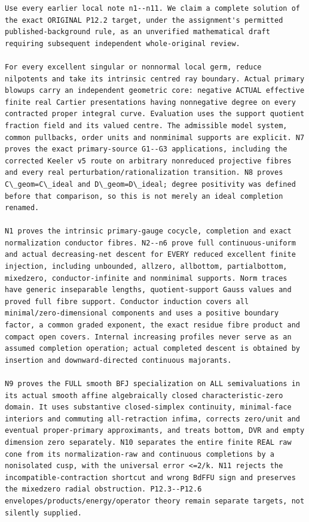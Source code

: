 \documentclass[11pt]{article}
\begin{document}
\begin{Verbatim}[breaklines,fontsize=\tiny]
Use every earlier local note n1--n11. We claim a complete solution of the exact ORIGINAL P12.2 target, under the assignment's permitted published-background rule, as an unverified mathematical draft requiring subsequent independent whole-original review.

For every excellent singular or nonnormal local germ, reduce nilpotents and take its intrinsic centred ray boundary. Actual primary blowups carry an independent geometric core: negative ACTUAL effective finite real Cartier presentations having nonnegative degree on every contracted proper integral curve. Evaluation uses the support quotient fraction field and its valued centre. The admissible model system, common pullbacks, order units and nonminimal supports are explicit. N7 proves the exact primary-source G1--G3 applications, including the corrected Keeler v5 route on arbitrary nonreduced projective fibres and every real perturbation/rationalization transition. N8 proves C\_geom=C\_ideal and D\_geom=D\_ideal; degree positivity was defined before that comparison, so this is not merely an ideal completion renamed.

N1 proves the intrinsic primary-gauge cocycle, completion and exact normalization conductor fibres. N2--n6 prove full continuous-uniform and actual decreasing-net descent for EVERY reduced excellent finite injection, including unbounded, allzero, allbottom, partialbottom, mixedzero, conductor-infinite and nonminimal supports. Norm traces have generic inseparable lengths, quotient-support Gauss values and proved full fibre support. Conductor induction covers all minimal/zero-dimensional components and uses a positive boundary factor, a common graded exponent, the exact residue fibre product and compact open covers. Internal increasing profiles never serve as an assumed completion operation; actual completed descent is obtained by insertion and downward-directed continuous majorants.

N9 proves the FULL smooth BFJ specialization on ALL semivaluations in its actual smooth affine algebraically closed characteristic-zero domain. It uses substantive closed-simplex continuity, minimal-face interiors and commuting all-retraction infima, corrects zero/unit and eventual proper-primary approximants, and treats bottom, DVR and empty dimension zero separately. N10 separates the entire finite REAL raw cone from its normalization-raw and continuous completions by a nonisolated cusp, with the universal error <=2/k. N11 rejects the incompatible-contraction shortcut and wrong BdFFU sign and preserves the mixedzero radial obstruction. P12.3--P12.6 envelopes/products/energy/operator theory remain separate targets, not silently supplied.


\end{Verbatim}
\end{document}
